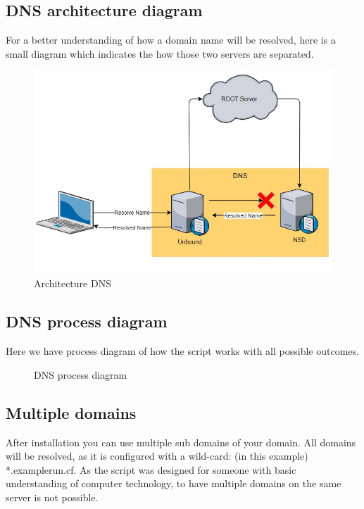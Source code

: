 \subsection{DNS architecture diagram}
For a better understanding of how a domain name will be resolved, here is a small diagram which indicates the how those two servers are separated.
\begin{figure}[H]
	\centering
	\includegraphics[width=0.9\linewidth]{diagram/dns_arch_diagramm.JPG}
	\caption{Architecture DNS}
	\label{fig:beforeWeb}
\end{figure}
\newpage
\subsection{DNS process diagram}
Here we have process diagram of how the script works with all possible outcomes.

\begin{figure}[H]
	\usetikzlibrary{shapes,arrows,calc}
	\centering
	
	\caption{DNS process diagram}
\end{figure}

\subsection{Multiple domains}
After installation you can use multiple sub domains of your domain. All domains will be resolved, as it is configured with a \gls{wild-card}: (in this example) *.examplerun.cf. As the script was designed for someone with basic understanding of computer technology, to have multiple domains on the same server is not possible.

\newpage
